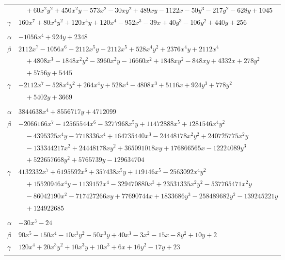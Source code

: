 \documentclass[11pt]{article}
\begin{document}
\begin{longtable}{@{}ll@{}}
 & $\quad +60x^{2}y^{2}+450x^{2}y-573x^{2}-30xy^{2}+489xy-1122x-50y^{3}-217y^{2}-628y+1045$\\
$\gamma$ & $160x^{7}+80x^{4}y^{2}+120x^{4}y+120x^{4}-952x^{3}-39x+40y^{3}-106y^{2}+440y+256$\\
\addlinespace[3pt]
\multicolumn{2}{@{}l}{$\{i,j\}=\{75,78\}$, $k_{ij}=5\cdot 7\cdot 13$}\\
$\alpha$ & $-1056x^{4}+924y+2348$\\
$\beta$ & $2112x^{7}-1056x^{6}-2112x^{5}y-2112x^{5}+528x^{4}y^{2}+2376x^{4}y+2112x^{4}$\\
 & $\quad +4808x^{3}-1848x^{2}y^{2}-3960x^{2}y-16660x^{2}+1848xy^{2}-848xy+4332x+278y^{2}$\\
 & $\quad +5756y+5445$\\
$\gamma$ & $-2112x^{7}-528x^{4}y^{2}+264x^{4}y+528x^{4}-4808x^{3}+5116x+924y^{3}+778y^{2}$\\
 & $\quad +5402y+3669$\\
\addlinespace[3pt]
\multicolumn{2}{@{}l}{$\{i,j\}=\{75,85\}$, $k_{ij}=2^{4}\cdot 5$}\\
$\alpha$ & $3844638x^{4}+8556717y+4712099$\\
$\beta$ & $-2066166x^{7}-12565544x^{6}-3277968x^{5}y+11472888x^{5}+1281546x^{4}y^{2}$\\
 & $\quad -4395325x^{4}y-7718336x^{4}+164735440x^{3}-24448178x^{2}y^{2}+240725775x^{2}y$\\
 & $\quad -133344217x^{2}+24448178xy^{2}+365091018xy+176866565x-12224089y^{3}$\\
 & $\quad +522657668y^{2}+5765739y-129634704$\\
$\gamma$ & $4132332x^{7}+6195592x^{6}+357438x^{5}y+119146x^{5}-2563092x^{4}y^{2}$\\
 & $\quad +15520946x^{4}y-1139152x^{4}-329470880x^{3}+23531335x^{2}y^{2}-537765471x^{2}y$\\
 & $\quad -86042190x^{2}-717427266xy+77690744x+1833686y^{3}-258489682y^{2}-139245221y$\\
 & $\quad +124922685$\\
\addlinespace[3pt]
\multicolumn{2}{@{}l}{$\{i,j\}=\{75,104\}$, $k_{ij}=2^{3}\cdot 3$}\\
$\alpha$ & $-30x^{3}-24$\\
$\beta$ & $90x^{5}-150x^{4}-10x^{3}y^{2}-50x^{3}y+40x^{3}-3x^{2}-15x-8y^{2}+10y+2$\\
$\gamma$ & $120x^{4}+20x^{3}y^{2}+10x^{3}y+10x^{3}+6x+16y^{2}-17y+23$\\
\addlinespace[3pt]
\multicolumn{2}{@{}l}{$\{i,j\}=\{76,77\}$, $k_{ij}=2^{3}\cdot 3^{4}$}\\

\end{longtable}
\end{document}
